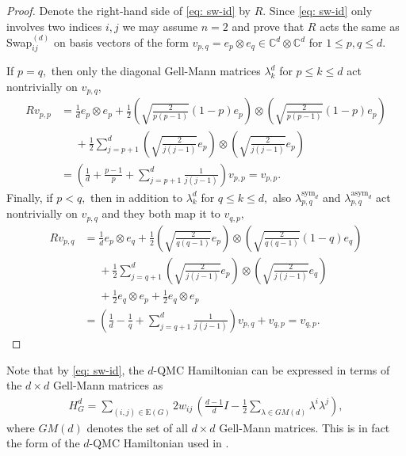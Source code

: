\documentclass[12pt,dvipsnames,accepted=2016-08-18,a4paper,onecolumn]{quantumarticle}
\renewcommand{\qedsymbol}{\rule[.12ex]{1.2ex}{1.2ex}}
\numberwithin{equation}{section}
\theoremstyle{definition}
\begin{document}
\begin{proof} Denote the right-hand side of \eqref{eq: sw-id} by $R.$
	Since \eqref{eq: sw-id} only involves two indices $i,j$ we may assume $n=2$ and prove that $R$ acts the same as Swap$_{ij}^{(d)}$ on basis vectors of the form $v_{p,q} = e_p \otimes e_q \in \mathbb{C}^d \otimes  \mathbb{C}^d$ for $1 \leq p,q \leq d.$ 
	
	If $p=q,$ then only the diagonal Gell-Mann matrices $\lambda_k^d$ for $p\leq k \leq d$ act nontrivially on $v_{p,q},$
	\begin{align*}
		Rv_{p,p} & = \frac{1}{d} e_p \otimes e_p + 
		\frac{1}{2} \left(\sqrt{\frac{2}{p(p-1)}}(1-p) e_p\right) \otimes \left(\sqrt{\frac{2}{p(p-1)}}(1-p) e_p\right)\\
		& \phantom{{}={}} + \frac{1}{2} \sum_{j=p+1}^d \left(\sqrt{\frac{2}{j(j-1)}} e_p\right) \otimes \left(\sqrt{\frac{2}{j(j-1)}}e_p \right) \\
		&= \left(\frac{1}{d} + \frac{p-1}{p} + \sum_{j=p+1}^d \frac{1}{j(j-1)}  \right)v_{p,p} =v_{p,p}.
	\end{align*}
 	Finally, if $p<q,$ then in addition to $\lambda_k^d$ for $q\leq k \leq d,$ also $\lambda_{p,q}^{\text{sym}_d}$ and $\lambda_{p,q}^{\text{asym}_d}$ act nontrivially on $v_{p,q}$ and they both map it to $v_{q,p},$
 	\begin{align*}
 		Rv_{p,q} &= \frac{1}{d} e_p \otimes e_q + 
 		\frac{1}{2} \left(\sqrt{\frac{2}{q(q-1)}} e_p\right) \otimes \left(\sqrt{\frac{2}{q(q-1)}}(1-q) e_q\right)\\
 		& \phantom{{}={}} + \frac{1}{2} \sum_{j=q+1}^d \left(\sqrt{\frac{2}{j(j-1)}} e_p\right) \otimes \left(\sqrt{\frac{2}{j(j-1)}}e_q \right) \\
 		& \phantom{{}={}} + \frac{1}{2}e_q \otimes e_p + \frac{1}{2}e_q \otimes e_p \\
 		&=\left(\frac{1}{d} - \frac{1}{q} + \sum_{j=q+1}^d \frac{1}{j(j-1)}  \right)v_{p,q} + v_{q,p} =v_{q,p}. %
        \tag*{\qed}
 	\end{align*}
\renewcommand{\qedsymbol}{}
\end{proof}

Note that by \eqref{eq: sw-id}, the $d$-QMC Hamiltonian can be expressed in terms of the $d \times d$ Gell-Mann matrices as 
\begin{align}\label{eq:HviaGM}
	H_G^{d} = \sum_{(i,j) \in \text{E}(G)} 
	2w_{ij} \, \left(  
	\frac{d-1}{d}I - 
	\frac{1}{2} \sum_{\lambda \in GM(d)} \lambda^i \lambda^j
	\right),
\end{align}
where $GM(d)$ denotes the set of all $d \times d$ Gell-Mann matrices. 
This is in fact the form of the $d$-QMC Hamiltonian used in \cite{CJKKW23+}. 
\end{document}
